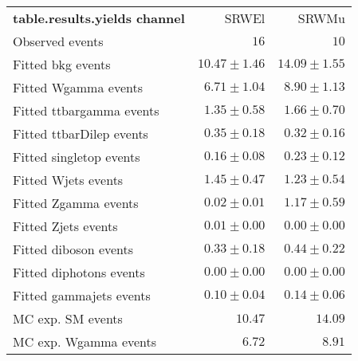 

\begin{table}
\begin{center}
\setlength{\tabcolsep}{0.0pc}
{\small
\begin{tabular*}{\textwidth}{@{\extracolsep{\fill}}lrr}
\noalign{\smallskip}\hline\noalign{\smallskip}
{\bf table.results.yields channel}           & SRWEl            & SRWMu              \\[-0.05cm]
\noalign{\smallskip}\hline\noalign{\smallskip}
Observed events          & $16$              & $10$                    \\
\noalign{\smallskip}\hline\noalign{\smallskip}
Fitted bkg events         & $10.47 \pm 1.46$          & $14.09 \pm 1.55$              \\
\noalign{\smallskip}\hline\noalign{\smallskip}
        Fitted Wgamma events         & $6.71 \pm 1.04$          & $8.90 \pm 1.13$              \\
        Fitted ttbargamma events         & $1.35 \pm 0.58$          & $1.66 \pm 0.70$              \\
        Fitted ttbarDilep events         & $0.35 \pm 0.18$          & $0.32 \pm 0.16$              \\
        Fitted singletop events         & $0.16 \pm 0.08$          & $0.23 \pm 0.12$              \\
        Fitted Wjets events         & $1.45 \pm 0.47$          & $1.23 \pm 0.54$              \\
        Fitted Zgamma events         & $0.02 \pm 0.01$          & $1.17 \pm 0.59$              \\
        Fitted Zjets events         & $0.01 \pm 0.00$          & $0.00 \pm 0.00$              \\
        Fitted diboson events         & $0.33 \pm 0.18$          & $0.44 \pm 0.22$              \\
        Fitted diphotons events         & $0.00 \pm 0.00$          & $0.00 \pm 0.00$              \\
        Fitted gammajets events         & $0.10 \pm 0.04$          & $0.14 \pm 0.06$              \\
 \noalign{\smallskip}\hline\noalign{\smallskip}
MC exp. SM events              & $10.47$          & $14.09$              \\
\noalign{\smallskip}\hline\noalign{\smallskip}
        MC exp. Wgamma events         & $6.72$          & $8.91$              \\

\end{tabular*}}
\end{center}
\end{table}

